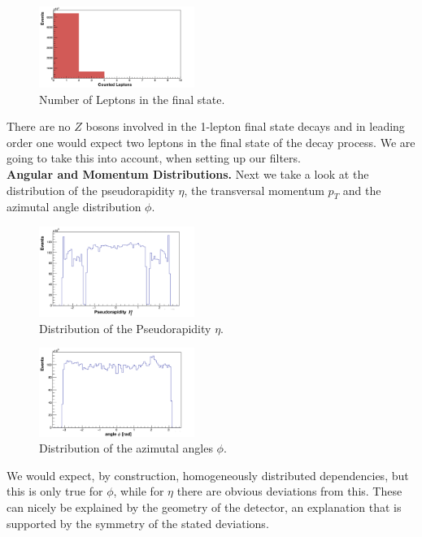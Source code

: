 \documentclass[twocolumn,
			   showpacs,%
               nofootinbib,
               aps,%
               prd,
               notitlepage,
               showkeys,
               10pt]{revtex4-1}
\begin{document}
\begin{figure}[H]
	\centering
	\includegraphics[width=0.45\textwidth]{figures/plots/lep_n_corr}
	\caption{Number of Leptons in the final state.}
	\label{fig:lep_n}
\end{figure}

There are no $Z$ bosons involved in the 1-lepton final state decays and in leading order one would expect two leptons in the final state of the decay process. We are going to take this into account, when setting up our filters.\\

\textbf{Angular and Momentum Distributions.}  
Next we take a look at the distribution of  the pseudorapidity $\eta$, the transversal momentum $p_T$ and the azimutal angle distribution $\phi$.

\begin{figure}[H]
	\centering
	\includegraphics[width=0.45\textwidth]{figures/plots/pseudorapidity_corr}
	\caption{Distribution of the Pseudorapidity $\eta$.}
\end{figure}

\begin{figure}[H]
	\centering
	\includegraphics[width=0.45\textwidth]{figures/plots/AzimutalAngle_corr}
	\caption{Distribution of the azimutal angles $\phi$.}
\end{figure}

We would expect, by construction, homogeneously distributed dependencies, but this is only true for $\phi$, while for $\eta$ there are obvious deviations from this.
These can nicely be explained by the geometry of the detector, an explanation that is supported by the symmetry of the stated deviations.\\
\end{document}
